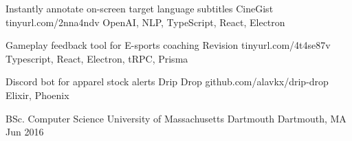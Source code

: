 \documentclass[]{awesome-cv}
\begin{document}
\vspace{-2mm}

\begin{cventries}
	\cventry
	{Instantly annotate on-screen target language subtitles}
	{CineGist}
	{tinyurl.com/2nna4ndv}
	{OpenAI, NLP, TypeScript, React, Electron}
	{}

	\vspace{-6mm}
	\cventry
	{Gameplay feedback tool for E-sports coaching}
	{Revision}
	{tinyurl.com/4t4se87v}
	{Typescript, React, Electron, tRPC, Prisma}
	{}

	\vspace{-6mm}
	\cventry
	{Discord bot for apparel stock alerts}
	{Drip Drop}
	{github.com/alavkx/drip-drop}
	{Elixir, Phoenix}
	{}
	
	\vspace{-4mm}
\end{cventries}

\begin{cvhonors}
	\cvhonor
	{BSc. Computer Science}
	{University of Massachusetts Dartmouth}
	{Dartmouth, MA}
	{Jun 2016}
\end{cvhonors}
\end{document}
